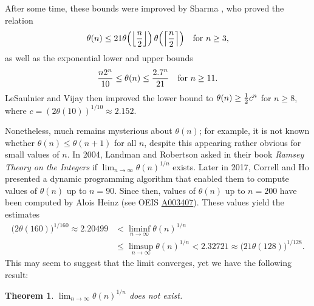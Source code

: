 \documentclass[twoside, reqno]{amsart} %
\newtheorem{theorem}{Theorem}
\begin{document}
After some time, these bounds were improved by
Sharma \cite{Sha09}, who proved the relation 
\begin{equation*}
\theta(n)\le21
\theta\Bigl(\Bigl\lfloor{n\over2}\Bigr\rfloor\Bigr)\,
\theta\Bigl(\Bigl\lceil{n\over2}\Bigr\rceil\Bigr)
\quad\text{for $n\ge3$,}
\end{equation*}
as well as the exponential lower and upper bounds
\begin{equation*}  
{n2^n\over10}\le\theta(n)\le{2.7^n\over21}
\quad\text{for $n\ge11$.}
\end{equation*}
LeSaulnier and Vijay \cite{LV11} then
improved the lower bound to $\theta(n)\ge{1\over2}c^n$ for $n\ge8$, 
where $c=(2\theta(10))^{1/10}\approx2.152$.



Nonetheless, much remains mysterious about $\theta(n)$; 
for example, it is not known whether
$\theta(n)\le\theta(n+1)$ for all $n$, despite this appearing rather obvious 
for small values of $n$. 
In 2004, Landman and Robertson \cite{LR04} asked in their book 
\textsl{Ramsey Theory on the Integers} if $\lim_{n\to\infty}\theta(n)^{1/n}$ exists.
Later in 2017, Correll and Ho \cite{CH17} presented a dynamic programming algorithm 
that enabled them to compute values of $\theta(n)$ up to $n=90$. Since then,
values of $\theta(n)$ up to $n=200$ have been computed by Alois Heinz 
(see OEIS \href{https://oeis.org/A003407}{A003407}). These values yield the estimates
\begin{align*}
\bigl(2\theta(160)\bigr)^{1/160}\approx2.20499 
&<\liminf_{n\to\infty}\theta(n)^{1/n} \\
&\le\limsup_{n\to\infty}\theta(n)^{1/n}<2.32721
\approx\bigl(21\theta(128)\bigr)^{1/128}.
\end{align*} 
This may seem to suggest that the limit converges, yet we have the following result:

\begin{theorem} \label{theorem:1}
$\lim_{n\to\infty}\theta(n)^{1/n}$
does not exist.
\end{theorem}

\begin{center}\vspace{0.5cm}\hspace*{-0.6cm} %
\end{center}
\end{document}
